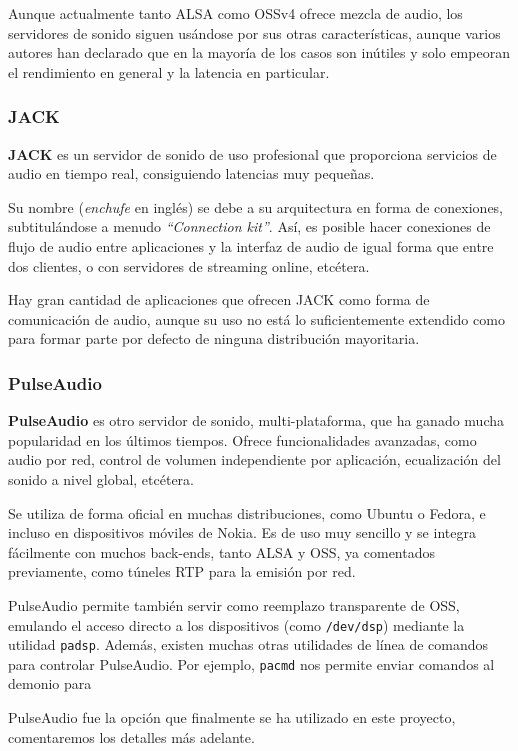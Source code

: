 Aunque actualmente tanto ALSA como OSSv4 ofrece mezcla de audio, los servidores
de sonido siguen usándose por sus otras características, aunque varios autores
han declarado que en la mayoría de los casos son inútiles y solo empeoran el
rendimiento en general y la latencia en particular.

\subsubsection{JACK}

\textbf{JACK} es un servidor de sonido de uso profesional que proporciona
servicios de audio en tiempo real, consiguiendo latencias muy pequeñas. 

Su nombre (\textit{enchufe} en inglés) se debe a su arquitectura en forma de
conexiones, subtitulándose a menudo \textit{``Connection kit''}. Así, es posible
hacer conexiones de flujo de audio entre aplicaciones y la interfaz de audio de
igual forma que entre dos clientes, o con servidores de streaming online,
etcétera.

Hay gran cantidad de aplicaciones que ofrecen JACK como forma de comunicación de
audio, aunque su uso no está lo suficientemente extendido como para formar parte
por defecto de ninguna distribución mayoritaria.

\subsubsection{PulseAudio}
\label{sec:pulseaudio1}
\textbf{PulseAudio} es otro servidor de sonido, multi-plataforma, que ha ganado
mucha popularidad en los últimos tiempos. Ofrece funcionalidades avanzadas, como
audio por red, control de volumen independiente por aplicación, ecualización del
sonido a nivel global, etcétera.

Se utiliza de forma oficial en muchas distribuciones, como Ubuntu o Fedora, e
incluso en dispositivos móviles de Nokia. Es de uso muy sencillo y se integra
fácilmente con muchos back-ends, tanto ALSA y OSS, ya comentados previamente,
como túneles RTP para la emisión por red.

PulseAudio permite también servir como reemplazo transparente de OSS, emulando
el acceso directo a los dispositivos (como \texttt{/dev/dsp}) mediante la
utilidad \texttt{padsp}. Además, existen muchas otras utilidades de línea de
comandos para controlar PulseAudio. Por ejemplo, \texttt{pacmd} nos permite
enviar comandos al demonio para 

PulseAudio fue la opción que finalmente se ha utilizado en este proyecto,
comentaremos los detalles más adelante.

